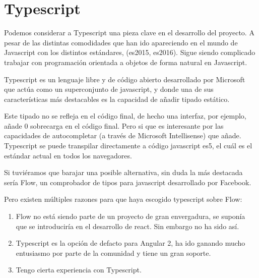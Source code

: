 


\section{Typescript}
\label{3:sec1}

Podemos considerar a Typescript una pieza clave en el desarrollo del proyecto. 
A pesar de las distintas comodidades que han ido apareciendo en el mundo de Javascript con 
los distintos estándares,  (es2015, es2016). Sigue siendo complicado trabajar con programación 
orientada a objetos de forma natural en Javascript.  

\bigskip
Typescript es un lenguaje libre y de código abierto desarrollado por Microsoft que
 actúa como un superconjunto de javascript, y donde una de sus características más 
 destacables es la capacidad de añadir tipado estático.

\bigskip
Este tipado no se refleja en el código final, de hecho una interfaz, por ejemplo,
añade 0 sobrecarga en el código final. Pero si que es interesante por las capacidades de
autocompletar (a través de Microsoft Intellisense)  que añade. Typescript se puede transpilar 
directamente a código javascript es5, el cuál es el estándar actual en todos los navegadores.    

\bigskip
Si tuviéramos que barajar una posible alternativa, sin duda la más destacada sería Flow, 
un comprobador de tipos para javascript desarrollado por Facebook. 

\bigskip
Pero existen múltiples razones para que haya escogido typescript sobre Flow:

\begin{enumerate}
\item Flow no está siendo parte de un proyecto de gran envergadura, se suponía que
 se introduciría en el desarrollo de react. Sin embargo no ha sido así.

\item Typescript es la opción de defacto para Angular 2, ha ido ganando mucho entusiasmo
 por parte de la comunidad y tiene un gran soporte.

\item Tengo cierta experiencia con Typescript.

\end{enumerate}

